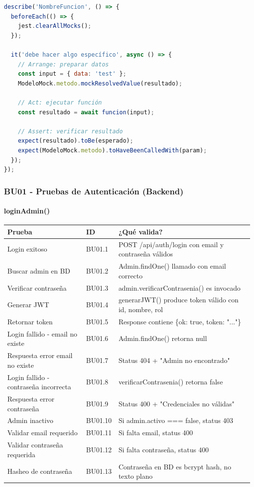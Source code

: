 \begin{lstlisting}[language=JavaScript, caption=Estructura base de prueba Jest]
describe('NombreFuncion', () => {
  beforeEach(() => {
    jest.clearAllMocks();
  });

  it('debe hacer algo específico', async () => {
    // Arrange: preparar datos
    const input = { data: 'test' };
    ModeloMock.metodo.mockResolvedValue(resultado);

    // Act: ejecutar función
    const resultado = await funcion(input);

    // Assert: verificar resultado
    expect(resultado).toBe(esperado);
    expect(ModeloMock.metodo).toHaveBeenCalledWith(param);
  });
});
\end{lstlisting}

\subsubsection{BU01 - Pruebas de Autenticación (Backend)}

\paragraph{loginAdmin()}

\begin{table}[H]
\centering
\begin{tabular}{|l|l|p{6cm}|}
\hline
\textbf{Prueba} & \textbf{ID} & \textbf{¿Qué valida?} \\ \hline
Login exitoso & BU01.1 & POST /api/auth/login con email y contraseña válidos \\ \hline
Buscar admin en BD & BU01.2 & Admin.findOne() llamado con email correcto \\ \hline
Verificar contraseña & BU01.3 & admin.verificarContrasenia() es invocado \\ \hline
Generar JWT & BU01.4 & generarJWT() produce token válido con id, nombre, rol \\ \hline
Retornar token & BU01.5 & Response contiene \{ok: true, token: "..."\} \\ \hline
Login fallido - email no existe & BU01.6 & Admin.findOne() retorna null \\ \hline
Respuesta error email no existe & BU01.7 & Status 404 + "Admin no encontrado" \\ \hline
Login fallido - contraseña incorrecta & BU01.8 & verificarContrasenia() retorna false \\ \hline
Respuesta error contraseña & BU01.9 & Status 400 + "Credenciales no válidas" \\ \hline
Admin inactivo & BU01.10 & Si admin.activo === false, status 403 \\ \hline
Validar email requerido & BU01.11 & Si falta email, status 400 \\ \hline
Validar contraseña requerida & BU01.12 & Si falta contraseña, status 400 \\ \hline
Hasheo de contraseña & BU01.13 & Contraseña en BD es bcrypt hash, no texto plano \\ \hline
\end{tabular}
\end{table}

